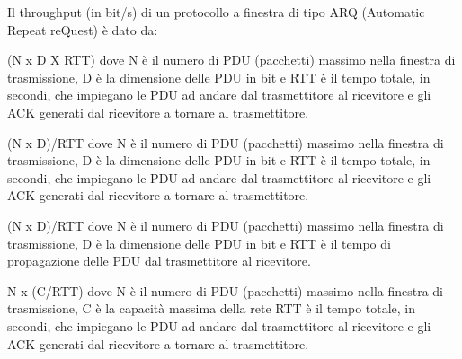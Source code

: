\question
Il throughput (in bit/s) di un protocollo a finestra di tipo ARQ (Automatic Repeat reQuest) è dato da:

\begin{checkboxes}
	\choice (N x D X RTT) dove N è il numero di PDU (pacchetti) massimo nella finestra di trasmissione, D è la dimensione delle PDU in bit e RTT è il tempo totale, in secondi, che impiegano le PDU ad andare dal trasmettitore al ricevitore e gli ACK generati dal ricevitore a tornare al trasmettitore.

	\CorrectChoice (N x D)/RTT dove N è il numero di PDU (pacchetti) massimo nella finestra di trasmissione, D è la dimensione delle PDU in bit e RTT è il tempo totale, in secondi, che impiegano le PDU ad andare dal trasmettitore al ricevitore e gli ACK generati dal ricevitore a tornare al trasmettitore.

	\choice (N x D)/RTT dove N è il numero di PDU (pacchetti) massimo nella finestra di trasmissione, D è la dimensione delle PDU in bit e RTT è il tempo di propagazione delle PDU dal trasmettitore al ricevitore.

	\choice N x (C/RTT) dove N è il numero di PDU (pacchetti) massimo nella finestra di trasmissione, C è la capacità massima della rete RTT è il tempo totale, in secondi, che impiegano le PDU ad andare dal trasmettitore al ricevitore e gli ACK generati dal ricevitore a tornare al trasmettitore.
\end{checkboxes}
